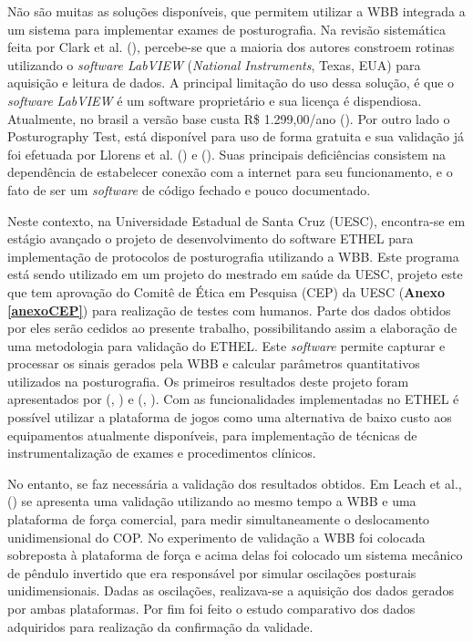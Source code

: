 Não são muitas as soluções disponíveis, que permitem utilizar a WBB integrada a um sistema para implementar exames de posturografia. Na revisão sistemática feita por Clark et al. (\citeyear{clark2018reliability}), percebe-se que a maioria dos autores constroem rotinas utilizando o \textit{software LabVIEW} (\textit{National Instruments}, Texas, EUA) para aquisição e leitura de dados. A principal limitação do uso dessa solução, é que o \textit{software} \textit{LabVIEW} é um software proprietário e sua licença é dispendiosa. Atualmente, no brasil a versão base custa R\$ 1.299,00/ano (\citeauthor{NationalInstruments}). Por outro lado o Posturography Test, está disponível para uso de forma gratuita e sua validação já foi efetuada por Llorens et al. (\citeyear{llorens2015low}) e (\citeyear{llorens2016posturography}). Suas principais deficiências consistem na dependência de estabelecer conexão com a internet para seu funcionamento, e o fato de ser um \textit{software} de código fechado e pouco documentado.

Neste contexto, na Universidade Estadual de Santa Cruz (UESC), encontra-se em estágio avançado o projeto de desenvolvimento do software ETHEL para implementação de protocolos de posturografia utilizando a WBB.  Este programa está sendo utilizado em um projeto do mestrado em saúde da UESC, projeto este que tem aprovação do Comitê de Ética em Pesquisa (CEP) da UESC (\textbf{Anexo} \textbf{\ref{anexoCEP}})  para realização de testes com humanos. Parte dos dados obtidos por eles serão cedidos ao presente trabalho, possibilitando assim a elaboração de uma metodologia para validação do ETHEL. Este \textit{software} permite capturar e processar os sinais gerados pela WBB e calcular parâmetros quantitativos utilizados na posturografia. Os primeiros resultados deste projeto foram apresentados por (\citeauthor{Thales2018}, \citeyear{Thales2018})  e (\citeauthor{Bizerra2018}, \citeyear{Bizerra2018}). Com as funcionalidades implementadas no ETHEL é possível utilizar a plataforma de jogos como uma alternativa de baixo custo aos equipamentos atualmente disponíveis, para implementação de técnicas de instrumentalização de exames e procedimentos clínicos.

No entanto, se faz necessária a validação dos resultados obtidos. Em Leach et al., (\citeyear{leach2014validating}) se apresenta uma validação utilizando ao mesmo tempo a WBB e uma plataforma de força comercial, para medir simultaneamente o deslocamento unidimensional do COP. No experimento de validação a WBB foi colocada sobreposta à plataforma de força e acima delas foi colocado um sistema mecânico de pêndulo invertido que era responsável por simular oscilações posturais unidimensionais. Dadas as oscilações, realizava-se a aquisição dos dados gerados por ambas plataformas. Por fim foi feito o estudo comparativo dos dados adquiridos para realização da confirmação da validade.

